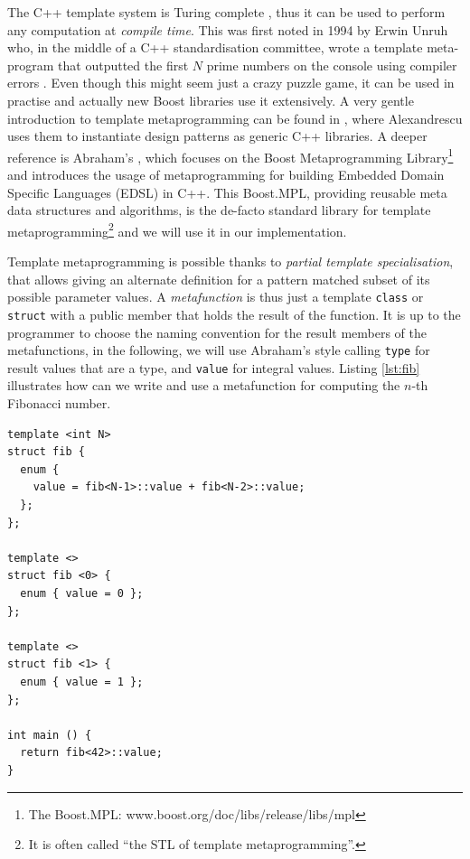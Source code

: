 The C++ template system is Turing complete
\cite{veldhuizen03templates}, thus it can be used to perform any
computation at \emph{compile time}. This was first noted in 1994 by
Erwin Unruh who, in the middle of a C++ standardisation committee,
wrote a template meta-program that outputted the first $N$ prime
numbers on the console using compiler errors \cite{unruh94prime}. Even
though this might seem just a crazy puzzle game, it can be used in
practise and actually new Boost libraries use it extensively. A very
gentle introduction to template metaprogramming can be found in
\cite{alexandrescu01modern}, where Alexandrescu uses them to
instantiate design patterns as generic C++ libraries. A deeper
reference is Abraham's \cite{abrahams04meta}, which focuses on the
Boost Metaprogramming Library\footnote{The Boost.MPL:
  www.boost.org/doc/libs/release/libs/mpl} and introduces the usage of
metaprogramming for building Embedded Domain Specific Languages (EDSL)
in C++. This Boost.MPL, providing reusable meta data structures and
algorithms, is the de-facto standard library for template
metaprogramming\footnote{It is often called ``the STL of template
  metaprogramming''.} and we will use it in our implementation.

Template metaprogramming is possible thanks to \emph{partial template
  specialisation}, that allows giving an alternate definition for a
pattern matched subset of its possible parameter values. A
\emph{metafunction} is thus just a template \texttt{class} or
\texttt{struct} with a public member that holds the result of the
function. It is up to the programmer to choose the naming convention
for the result members of the metafunctions, in the following, we will
use Abraham's style calling \texttt{type} for result values that are a
type, and \texttt{value} for integral values. Listing \ref{lst:fib}
illustrates how can we write and use a metafunction for computing the
$n$-th Fibonacci number.

\begin{lstlisting}[float=h!, 
  caption=Metaprogram for computing the Nth Fibonacci number,
  label=lst:fib]
template <int N>
struct fib {
  enum { 
    value = fib<N-1>::value + fib<N-2>::value; 
  };
};

template <>
struct fib <0> {
  enum { value = 0 };
};

template <>
struct fib <1> {
  enum { value = 1 };
};

int main () {
  return fib<42>::value;
}  
\end{lstlisting}

